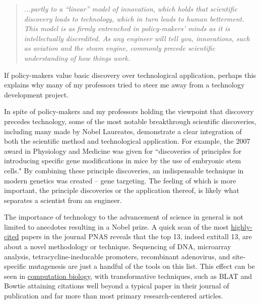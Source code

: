     \begin{quote} 
      \itshape 
      \singlespacing
      ...partly to a ``linear'' model of innovation, which holds that scientific discovery leads to technology, which in turn leads to human betterment.  This model is as firmly entrenched in policy-makers' minds as it is intellectually discredited.  As any engineer will tell you, innovations, such as aviation and the steam engine, commonly precede scientific understanding of how things work.
      \end{quote} 

    If policy-makers value basic discovery over technological application, perhaps this explains why many of my professors tried to steer me away from a technology development project.

    In spite of policy-makers and my professors holding the viewpoint that discovery precedes technology, some of the most notable breakthrough scientific discoveries, including many made by Nobel Laureates, demonstrate a clear integration of both the scientific method and technological application.  For example, the 2007 award in Physiology and Medicine was given for “discoveries of principles for introducing specific gene modifications in mice by the use of embryonic stem cells."  By combining these principle discoveries, an indispensable technique in modern genetics was created – gene targeting.  The feeling of which is more important, the principle discoveries or the application thereof, is likely what separates a scientist from an engineer. 

    The importance of technology to the advancement of science in general is not limited to anecdotes resulting in a Nobel prize. A quick scan of the most \href{http://www.pnas.org/reports/most-cited}{highly-cited} papers in the journal PNAS reveals that the top 13, indeed   extit{all} 13, are about a novel methodology or technique. Sequencing of DNA, microarray analysis, tetracycline-ineducable promoters, recombinant adenovirus, and site-specific mutagenesis are just a handful of the tools on this list. This effect can be seen in \href{http://simplystatistics.org/2014/04/07/writing-good-software-can-have-more-impact-than-publishing-in-high-impact-journals-for-genomic-statisticians/}{computation biology}, with transformative techniques, such as BLAT \citep{Altschul1990} and Bowtie \citep{Langmead2009} attaining citations well beyond a typical paper in their journal of publication and far more than most primary research-centered articles.

